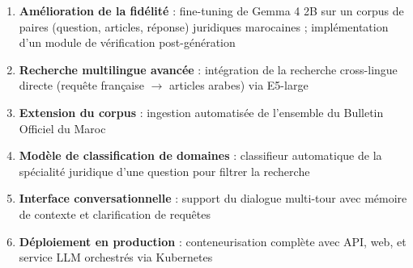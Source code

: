 \begin{enumerate}
    \item \textbf{Amélioration de la fidélité} : fine-tuning de Gemma 4 2B
    sur un corpus de paires (question, articles, réponse) juridiques
    marocaines ; implémentation d'un module de vérification post-génération
    \item \textbf{Recherche multilingue avancée} : intégration de la
    recherche cross-lingue directe (requête française $\rightarrow$ articles
    arabes) via E5-large
    \item \textbf{Extension du corpus} : ingestion automatisée de
    l'ensemble du Bulletin Officiel du Maroc
    \item \textbf{Modèle de classification de domaines} : classifieur
    automatique de la spécialité juridique d'une question pour filtrer
    la recherche
    \item \textbf{Interface conversationnelle} : support du dialogue
    multi-tour avec mémoire de contexte et clarification de requêtes
    \item \textbf{Déploiement en production} : conteneurisation complète
    avec API, web, et service LLM orchestrés via Kubernetes
\end{enumerate}
